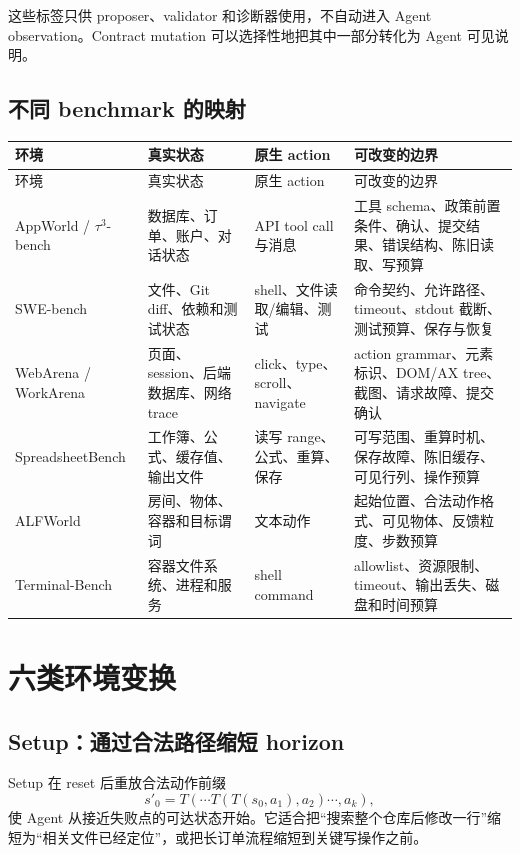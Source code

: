 \documentclass[11pt,a4paper,fontset=fandol]{ctexart}
\begin{document}
这些标签只供 proposer、validator 和诊断器使用，不自动进入 Agent observation。Contract mutation 可以选择性地把其中一部分转化为 Agent 可见说明。

\subsection{不同 benchmark 的映射}

\begin{longtable}{L{2.8cm}L{3.4cm}L{3.5cm}L{5.2cm}}
\toprule
环境 & 真实状态 & 原生 action & 可改变的边界 \\
\midrule
\endfirsthead
\toprule
环境 & 真实状态 & 原生 action & 可改变的边界 \\
\midrule
\endhead
AppWorld / $\tau^3$-bench & 数据库、订单、账户、对话状态 & API tool call 与消息 & 工具 schema、政策前置条件、确认、提交结果、错误结构、陈旧读取、写预算 \\
SWE-bench & 文件、Git diff、依赖和测试状态 & shell、文件读取/编辑、测试 & 命令契约、允许路径、timeout、stdout 截断、测试预算、保存与恢复 \\
WebArena / WorkArena & 页面、session、后端数据库、网络 trace & click、type、scroll、navigate & action grammar、元素标识、DOM/AX tree、截图、请求故障、提交确认 \\
SpreadsheetBench & 工作簿、公式、缓存值、输出文件 & 读写 range、公式、重算、保存 & 可写范围、重算时机、保存故障、陈旧缓存、可见行列、操作预算 \\
ALFWorld & 房间、物体、容器和目标谓词 & 文本动作 & 起始位置、合法动作格式、可见物体、反馈粒度、步数预算 \\
Terminal-Bench & 容器文件系统、进程和服务 & shell command & allowlist、资源限制、timeout、输出丢失、磁盘和时间预算 \\
\bottomrule
\end{longtable}

\section{六类环境变换}

\subsection{Setup：通过合法路径缩短 horizon}

Setup 在 reset 后重放合法动作前缀
\begin{equation}
s'_0=T(\cdots T(T(s_0,a_1),a_2)\cdots,a_k),
\end{equation}
使 Agent 从接近失败点的可达状态开始。它适合把“搜索整个仓库后修改一行”缩短为“相关文件已经定位”，或把长订单流程缩短到关键写操作之前。
\end{document}
